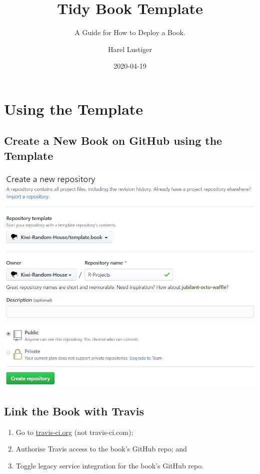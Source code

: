 \documentclass[]{book}
\title{Tidy Book Template}
\subtitle{A Guide for How to Deploy a Book.}
\author{Harel Lustiger}
\date{2020-04-19}
\providecommand{\tightlist}{%
  \setlength{\itemsep}{0pt}\setlength{\parskip}{0pt}}
\begin{document}
\maketitle

{
\setcounter{tocdepth}{1}
\tableofcontents
}
\hypertarget{demo}{%
\chapter{Using the Template}\label{demo}}

\hypertarget{create-a-new-book-on-github-using-the-template}{%
\section{Create a New Book on GitHub using the Template}\label{create-a-new-book-on-github-using-the-template}}

\begin{center}\includegraphics[width=0.7\linewidth]{images/a9676ba37e5e4ca8b9489239db8cb8d8} \end{center}

\hypertarget{link-the-book-with-travis}{%
\section{Link the Book with Travis}\label{link-the-book-with-travis}}

\begin{enumerate}
\def\labelenumi{\arabic{enumi}.}
\tightlist
\item
  Go to \href{https://travis-ci.org/}{travis-ci.org} (not travis-ci.com);
\item
  Authorise Travis access to the book's GitHub repo; and
\item
  Toggle legacy service integration for the book's GitHub repo.
\end{enumerate}
\end{document}
